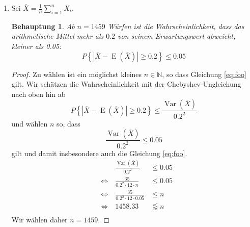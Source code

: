 \documentclass[a4paper]{scrartcl}
\newtheorem*{behaupt}{Behauptung}
\newcommand{\gdw}{\Leftrightarrow}
\newcommand{\e}{\operatorname{E}}
\newcommand{\var}{\operatorname{Var}}
\begin{document}
\begin{enumerate}[label=\bfseries\arabic*.]
\begin{enumerate}[label=(\alph*)]
            \item
                Sei $\overline{X} = \frac{1}{n} \sum_{i=1}^n X_i$.
                \begin{behaupt}
                    Ab $n = 1459$ Würfen ist die Wahrscheinlichkeit, dass das
                    arithmetische Mittel mehr als $\num{0,2}$ von seinem
                    Erwartungswert abweicht, kleiner als \num{0,05}:
                \begin{equation}
                    P\left\lbrace|\overline{X} - \e(\overline{X})| \geq \num{0,2}\right\rbrace
                    \leq \num{0,05}
                    \label{eq:foo}
                \end{equation}
                \end{behaupt}
                \begin{proof}
                Zu wählen ist ein möglichst kleines $n \in \mathbb{N}$, so dass
                Gleichung \eqref{eq:foo} gilt.
                Wir schätzen die Wahrscheinlichkeit mit der
                Chebyshev-Ungleichung nach oben hin ab
                \begin{equation*}
                    P\left\lbrace|\overline{X} - \e(\overline{X})| \geq \num{0,2}\right\rbrace
                    \leq \frac{\var(\overline{X})}{\num{0,2}^2}
                \end{equation*}
                und wählen $n$ so, dass
                \begin{equation*}
                    \frac{\var(\overline{X})}{\num{0,2}^2}
                    \leq \num{0,05}
                \end{equation*}
                gilt und damit insbesondere auch die Gleichung \eqref{eq:foo}.
                \begin{equation*}
                    \begin{alignedat}{2}
                        && \frac{\var(\overline{X})}{\num{0,2}^2}
                        &\leq \num{0,05} \\
                        &\gdw\ & \frac{35}{\num{0,2}^2 \cdot 12 \cdot n}
                        &\leq \num{0,05} \\
                        &\gdw\ &\frac{35}{\num{0,2}^2 \cdot 12 \cdot \num{0,05}}
                        &\leq n \\
                        &\gdw\ & \num{1458,33}
                        &\lessapprox n \\
                    \end{alignedat}
                \end{equation*}
                Wir wählen daher $n = 1459$.
                \end{proof}


\end{enumerate}
\end{enumerate}
\end{document}
